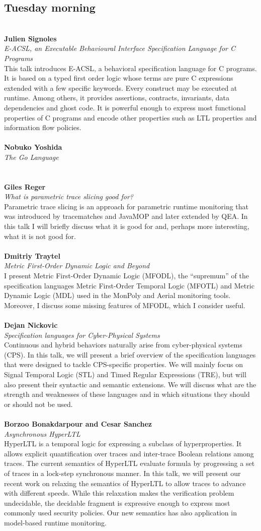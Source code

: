 \documentclass{article}
\newcounter{talkc}
\newcommand{\talk}[3]{\stepcounter{talkc}
\vspace{0.5em}~\\
\noindent
\textbf{#1}\\ 
\noindent\emph{#2}\\ 
\noindent#3\\
}
\begin{document}
\subsection*{Tuesday morning}

\talk{Julien Signoles}{E-ACSL, an Executable Behavioural Interface Specification Language for C Programs}{This talk introduces E-ACSL, a behavioral specification language for C programs. It is based on a typed first order logic whose terms are pure C expressions extended with a few specific keywords. Every construct may be executed at runtime. Among others, it provides assertions, contracts, invariants, data dependencies and ghost code. It is powerful enough to express most functional properties of C programs and encode other properties such as LTL properties and information flow policies.}
%
\talk{Nobuko Yoshida}{The Go Language}{}
%
\talk{Giles Reger}{What is parametric trace slicing good for?}{Parametric trace slicing is an approach for parametric runtime monitoring that was introduced by tracematches and JavaMOP and later extended by QEA. In this talk I will briefly discuss what it is good for and, perhaps more interesting, what it is not good for.}
%
\talk{Dmitriy Traytel}{Metric First-Order Dynamic Logic and Beyond}{I present Metric First-Order Dynamic Logic (MFODL), the ``supremum'' of the specification languages Metric First-Order Temporal Logic (MFOTL) and Metric Dynamic Logic (MDL) used in the {\sc MonPoly} and {\sc Aerial} monitoring tools. Moreover, I discuss some missing features of MFODL, which I consider useful.}
%
\talk{Dejan Nickovic}{ Specification languages for Cyber-Physical Systems}{Continuous and hybrid behaviors naturally arise from cyber-physical systems (CPS). In this talk, we will present a brief overview of the specification languages that were designed to tackle CPS-specific properties. We will mainly focus on Signal Temporal Logic (STL) and Timed Regular Expressions (TRE), but will also present their syntactic and semantic extensions. We will discuss what are the strength and weaknesses of these languages and in which situations they should or should not be used.}
%
%
\talk{Borzoo Bonakdarpour and Cesar Sanchez}{Asynchronous HyperLTL}{HyperLTL is a temporal logic for expressing a subclass of hyperproperties. It allows explicit quantification over traces and inter-trace Boolean relations among traces. The current semantics of HyperLTL evaluate formula by progressing a set of traces in a lock-step synchronous manner. In this talk, we will present our recent work on relaxing the semantics of HyperLTL to allow traces to advance with different speeds. While this relaxation makes the verification problem undecidable, the decidable fragment is expressive enough to express most commonly used security policies. Our new semantics has also application in model-based runtime monitoring.}
\end{document}
